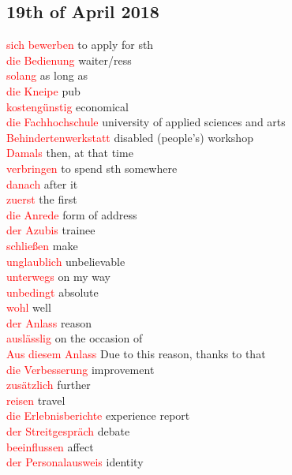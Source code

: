 \documentclass{article}
\begin{document}
\begin{multicols}{2}
	\section*{19th of April 2018}
	\textcolor{red}{sich bewerben} to apply for sth\\
	\textcolor{red}{die Bedienung} waiter/ress\\
	\textcolor{red}{solang} as long as \\ 
	\textcolor{red}{die Kneipe} pub\\
	\textcolor{red}{kostengünstig} economical\\ 
	\textcolor{red}{die Fachhochschule} university of applied sciences and arts\\ 
	\textcolor{red}{Behindertenwerkstatt} disabled (people's) workshop \\
	\textcolor{red}{Damals} then, at that time\\ 
	\textcolor{red}{verbringen} to spend sth somewhere\\ 
	\textcolor{red}{danach} after it\\
	\textcolor{red}{zuerst} the first \\ 
	\textcolor{red}{die Anrede} form of address\\
	\textcolor{red}{der Azubis} trainee\\
	\textcolor{red}{schließen} make\\
	\textcolor{red}{unglaublich} unbelievable\\
	\textcolor{red}{unterwegs} on my way\\
	\textcolor{red}{unbedingt} absolute\\
	\textcolor{red}{wohl} well \\
	\textcolor{red}{der Anlass} reason\\
	\textcolor{red}{auslässlig} on the occasion of\\
	\textcolor{red}{Aus diesem Anlass} Due to this reason, thanks to that\\
	\textcolor{red}{die Verbesserung} improvement\\
	\textcolor{red}{zusätzlich} further\\
	\textcolor{red}{reisen} travel\\
	\textcolor{red}{die Erlebnisberichte} experience report\\
	\textcolor{red}{der Streitgespräch} debate\\
	\textcolor{red}{beeinflussen} affect\\
	\textcolor{red}{der Personalausweis} identity\\
	

\end{multicols}
\end{document}
